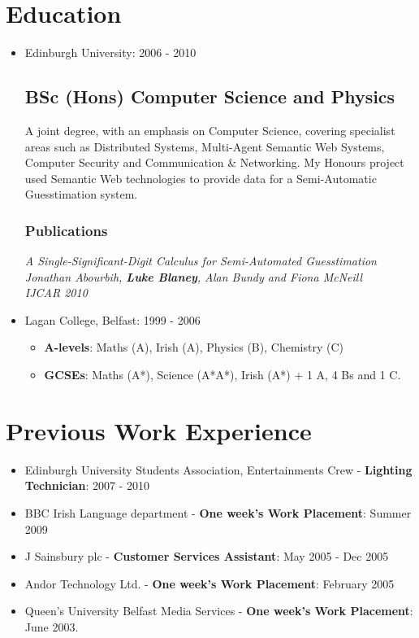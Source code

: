 \documentclass[a4paper]{article}
\newenvironment{detail}{\begin{adjustwidth}{10pt}{}}{\end{adjustwidth}}
\begin{document}
\section*{Education}
\begin{itemize}

\item Edinburgh University: 2006 - 2010
\subsection*{BSc (Hons) Computer Science and Physics}
\begin{detail}
A joint degree, with an emphasis on Computer Science, covering specialist areas such as Distributed Systems, Multi-Agent Semantic Web Systems, Computer Security and Communication \& Networking.
My Honours project used Semantic Web technologies to provide data for a Semi-Automatic Guesstimation system.
\subsubsection*{Publications}
\em A Single-Significant-Digit Calculus for Semi-Automated Guesstimation \em\\
Jonathan Abourbih, {\bf Luke Blaney}, Alan Bundy and Fiona McNeill\\
IJCAR 2010
\end{detail}

\item Lagan College, Belfast: 1999 - 2006
\begin{itemize}\item {\bf A-levels}: Maths (A), Irish (A), Physics (B), Chemistry (C)
\item {\bf GCSEs}: Maths (A*), Science (A*A*), Irish (A*) + 1 A, 4 Bs and 1 C.
\end{itemize}

\end{itemize}

\section*{Previous Work Experience}
\begin{itemize}

\item Edinburgh University Students Association, Entertainments Crew - {\bf Lighting Technician}: 2007 - 2010
\item BBC Irish Language department - {\bf One week's Work Placement}: Summer 2009
\item J Sainsbury plc - {\bf Customer Services Assistant}: May 2005 - Dec 2005
\item Andor Technology Ltd. - {\bf One week's Work Placement}:  February 2005
\item Queen's University Belfast Media Services - {\bf One week's Work Placement}:  June 2003.

\end{itemize}
\end{document}
